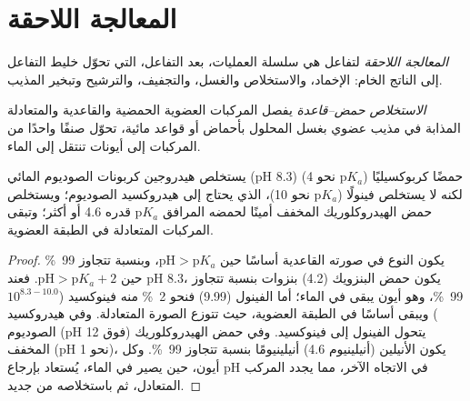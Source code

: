 \section{المعالجة اللاحقة}

\begin{definition}\label{def:b2:lab-techniques-2:work-up}
\emph{المعالجة اللاحقة} لتفاعل هي سلسلة العمليات، بعد التفاعل، التي
تحوّل خليط التفاعل إلى الناتج الخام: الإخماد، والاستخلاص والغسل، والتجفيف،
والترشيح وتبخير المذيب.
\end{definition}

\begin{definition}\label{def:b2:lab-techniques-2:acid-base-extraction}
\emph{الاستخلاص حمض--قاعدة} يفصل المركبات العضوية الحمضية والقاعدية والمتعادلة
المذابة في مذيب عضوي بغسل المحلول بأحماض أو قواعد مائية،
تحوّل صنفًا واحدًا من المركبات إلى أيونات تنتقل إلى الماء.
\end{definition}

\begin{proposition}\label{prop:b2:lab-techniques-2:acid-base-extraction}
يستخلص هيدروجين كربونات الصوديوم المائي (pH 8.3) حمضًا كربوكسيليًا ($\mathrm pK_a$ نحو 4) لكنه لا يستخلص
فينولًا ($\mathrm pK_a$ نحو 10)، الذي يحتاج إلى هيدروكسيد الصوديوم؛ ويستخلص حمض الهيدروكلوريك المخفف
أمينًا لحمضه المرافق $\mathrm pK_a$ قدره 4.6 أو أكثر؛ وتبقى المركبات المتعادلة في الطبقة
العضوية.
\end{proposition}

\begin{proof}
يكون النوع في صورته القاعدية أساسًا حين $\mathrm{pH} > \mathrm pK_a$، وبنسبة تتجاوز 99~\% حين
$\mathrm{pH} > \mathrm pK_a + 2$. فعند pH 8.3، يكون حمض البنزويك (4.2) بنزوات بنسبة تتجاوز 99~\%، وهو أيون
يبقى في الماء؛ أما الفينول (9.99) فنحو 2~\% منه فينوكسيد ($10^{8.3 - 10.0}$) ويبقى أساسًا
في الطبقة العضوية، حيث تتوزع الصورة المتعادلة. وفي هيدروكسيد الصوديوم (pH فوق 12) يتحول الفينول
إلى فينوكسيد. وفي حمض الهيدروكلوريك المخفف (pH نحو 1)، يكون الأنيلين (أنيلينيوم 4.6) أنيلينيومًا بنسبة تتجاوز
99~\%. وكل أيون، حين يصير في الماء، يُستعاد بإرجاع pH في الاتجاه الآخر، مما
يجدد المركب المتعادل، ثم باستخلاصه من جديد.
\end{proof}

